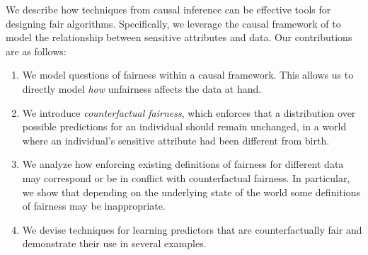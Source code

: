 % 

We describe how techniques from causal inference can be effective tools for designing fair algorithms. Specifically, we
leverage the causal framework of 
\citet{pearl2009causal} to model the relationship between sensitive
attributes and data. Our contributions are as follows:
\begin{enumerate}
    \item We model questions of fairness within a causal framework. This allows us to directly model \emph{how} unfairness affects the data at hand.
    \item We introduce \emph{counterfactual fairness}, which enforces that a distribution over possible predictions for an individual should remain unchanged, in a world where an individual's sensitive attribute had been different from birth.
    \item We analyze how enforcing existing definitions of fairness for different data may correspond or be in conflict with counterfactual fairness. In particular, we show that depending on the underlying state of the world some definitions of fairness may be inappropriate.
    \item We devise techniques for learning predictors that are counterfactually fair and demonstrate their use in several examples.
\end{enumerate}





